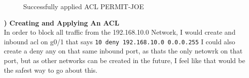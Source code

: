 \documentclass{report}
\newcommand{\mysubsection}[2]{\textbf{\romannumeral #1) #2}}
\begin{document}
\begin{figure}[!hbt]\centering
{}\hfill
{}\par 
\caption{Successfully applied ACL PERMIT-JOE}\label{Verify17}
\end{figure}




\noindent\mysubsection{2}{Creating and Applying An ACL}\\
In order to block all traffic from the 192.168.10.0 Network, I would create and
inbound acl on g0/1 that says 
{\scriptsize{\verb$10 deny 192.168.10.0 0.0.0.255$}\normalsize} 
I could also create a deny any on that same inbound port, as thats the only
netowrk on that port, but as other networks can be created in the future, I
feel like that would be the safest way to go about this.
\end{document}
